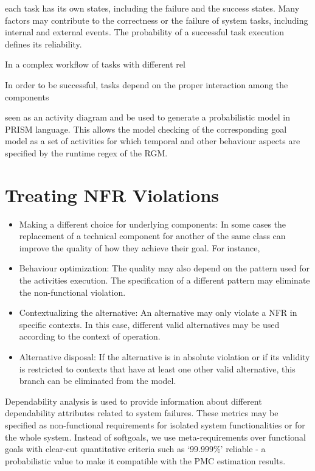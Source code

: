 each task has its own states, including the failure and the success states. Many factors may contribute to the correctness or the failure of system tasks, including internal and external events. The probability of a successful task execution defines its reliability. 

In a complex workflow of tasks with different rel 

In order to be successful, tasks depend on the proper interaction among the components 

seen as an activity diagram and be used to generate a probabilistic model in PRISM language. This allows the model checking of the corresponding goal model as a set of activities for which temporal and other behaviour aspects are specified by the runtime regex of the RGM.

\section{Treating NFR Violations}

\begin{itemize}

\item Making a different choice for underlying components: In some cases the replacement of a technical component for another of the same class can improve the quality of how they achieve their goal. For instance,
\medskip

\item Behaviour optimization: The quality may also depend on the pattern used for the activities execution. The specification of a different pattern may eliminate the non-functional violation. 
\medskip

\item Contextualizing the alternative: An alternative may only violate a NFR in specific contexts. In this case, different valid alternatives may be used according to the context of operation.
\medskip

\item Alternative disposal: If the alternative is in absolute violation or if its validity is restricted to contexts that have at least one other valid alternative, this branch can be eliminated from the model.

\end{itemize}

Dependability analysis is used to provide information about different dependability attributes related to system failures. These metrics may be specified as non-functional requirements for isolated system functionalities or for the whole system. Instead of softgoals, we use meta-requirements over functional goals with clear-cut quantitative criteria such as `99.999\%' reliable - a probabilistic value to make it compatible with the PMC estimation results.

